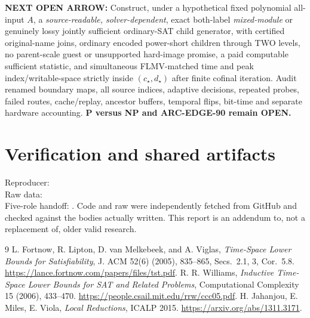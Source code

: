 \documentclass[11pt]{article}
\begin{document}
\noindent\textbf{NEXT OPEN ARROW:}
Construct, under a hypothetical fixed polynomial
all-input $A$, a \emph{source-readable, solver-dependent},
exact both-label \emph{mixed-module} or genuinely
lossy jointly sufficient ordinary-SAT child generator,
with certified original-name joins, ordinary encoded
power-short children through TWO levels,
no parent-scale guest or unsupported hard-image promise,
a paid computable sufficient statistic, and simultaneous
FLMV-matched time and peak index/writable-space strictly
inside $(c_\star,d_\star)$ after finite cofinal iteration.
Audit renamed boundary maps, all source indices,
adaptive decisions, repeated probes, failed routes,
cache/replay, ancestor buffers, temporal flips,
bit-time and separate hardware accounting.
\textbf{P versus NP and ARC-EDGE-90 remain OPEN.}

\section*{Verification and shared artifacts}
\noindent Reproducer:
\\
Raw data:
\\
Five-role handoff:
.
Code and raw were independently fetched from GitHub and checked against
the bodies actually written. This report is an addendum to, not a
replacement of, older valid research.

\begin{thebibliography}{9}
 L. Fortnow, R. Lipton, D. van Melkebeek, and A. Viglas,
\emph{Time-Space Lower Bounds for Satisfiability}, J. ACM 52(6)
(2005), 835--865, Secs.~2.1, 3, Cor.~5.8.
\url{https://lance.fortnow.com/papers/files/tst.pdf}.
 R. R. Williams,
\emph{Inductive Time-Space Lower Bounds for SAT and Related Problems},
Computational Complexity 15 (2006), 433--470.
\url{https://people.csail.mit.edu/rrw/ccc05.pdf}.
 H. Jahanjou, E. Miles, E. Viola,
\emph{Local Reductions}, ICALP 2015.
\url{https://arxiv.org/abs/1311.3171}.
\end{thebibliography}
\end{document}
